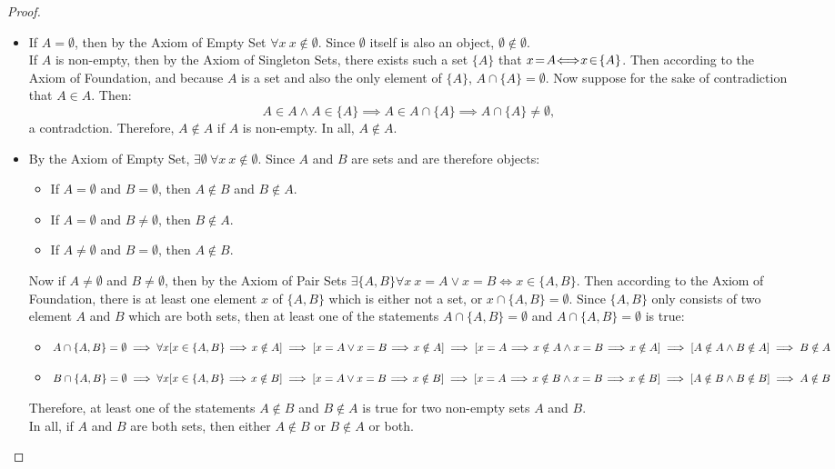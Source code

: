 \documentclass[a4paper]{book}
\newtheorem*{proof}{\textit{Proof.}}
\theoremstyle{break}
\begin{document}
			\begin{proof}~
				\begin{itemize}
					\item If $A=\emptyset$, then by the Axiom of Empty Set $\forall x~x\notin\emptyset$. Since $\emptyset$ itself is also an object, $\emptyset\notin\emptyset$.\\
					If $A$ is non-empty, then by the Axiom of Singleton Sets, there exists such a set $\{A\}$ that $x\!=\!A\mspace{-9mu}\iff\mspace{-9mu}x\!\in\!\{A\}$. Then according to the Axiom of Foundation, and because $A$ is a set and also the only element of $\{A\}$, $A\cap\{A\}=\emptyset$. Now suppose for the sake of contradiction that $A\in A$. Then: $$A\in A\land A\in\{A\}\implies A\in A\cap\{A\}\implies A\cap\{A\}\neq\emptyset,$$ a contradction. Therefore, $A\notin A$ if $A$ is non-empty.
					In all, $A\notin A$.
					\item By the Axiom of Empty Set, $\exists\emptyset~\forall x~x\notin\emptyset$. Since $A$ and $B$ are sets and are therefore objects:
					\begin{itemize}
						\item If $A=\emptyset$ and $B=\emptyset$, then $A\notin B$ and $B\notin A$.
						\item If $A=\emptyset$ and $B\neq\emptyset$, then $B\notin A$.
						\item If $A\neq\emptyset$ and $B=\emptyset$, then $A\notin B$.
					\end{itemize}
					Now if $A\neq\emptyset$ and $B\neq\emptyset$, then by the Axiom of Pair Sets $\exists\{A,B\}\forall x~x=A\lor x=B\iff x\in\{A,B\}$. Then according to the Axiom of Foundation, there is at least one element $x$ of $\{A,B\}$ which is either not a set, or $x\cap \{A,B\}=\emptyset$. Since $\{A,B\}$ only consists of two element $A$ and $B$ which are both sets, then at least one of the statements $A\cap\{A,B\}=\emptyset$ and $A\cap\{A,B\}=\emptyset$ is true:
					\begin{itemize}
						\item $A\cap\{A,B\}=\emptyset\implies\forall x[x\in\{A,B\}\!\implies\!x\notin A]\implies[x=A\lor x=B\!\implies\!x\notin A]\\\implies[x=A\!\implies\!x\notin A\land x=B\!\implies\!x\notin A]\implies[A\notin A\land B\notin A]\implies B\notin A$
						\item $B\cap\{A,B\}=\emptyset\implies\forall x[x\in\{A,B\}\!\implies\!x\notin B]\implies[x=A\lor x=B\!\implies\!x\notin B]\\\implies[x=A\!\implies\!x\notin B\land x=B\!\implies\!x\notin B]\implies[A\notin B\land B\notin B]\implies A\notin B$
					\end{itemize}
					Therefore, at least one of the statements $A\notin B$ and $B\notin A$ is true for two non-empty sets $A$ and $B$.\\
					In all, if $A$ and $B$ are both sets, then either $A\notin B$ or $B\notin A$ or both.
				\end{itemize}
			\end{proof}
\end{document}
